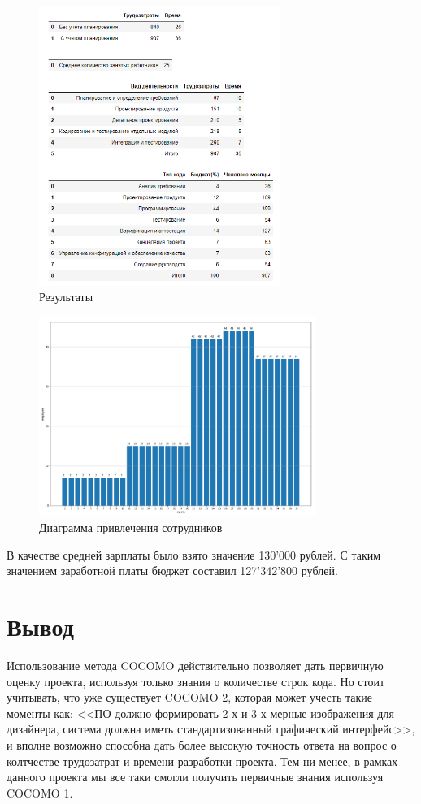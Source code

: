 \begin{figure}[H]
	\centering
	\includegraphics[width=0.7\textwidth]{img/content/task_02_result.png}
	\caption{Результаты}
	\label{fig:task_02_result}
\end{figure}

\begin{figure}[H]
	\centering
	\includegraphics[width=0.8\textwidth]{img/content/task_02_plot.png}
	\caption{Диаграмма привлечения сотрудников}
	\label{fig:task_02_plot}
\end{figure}

В качестве средней зарплаты было взято значение 130'000 рублей. С таким значением заработной платы бюджет составил 127'342'800 рублей.

\section{Вывод}

Использование метода COCOMO действительно позволяет дать первичную оценку проекта, используя только знания о количестве строк кода. Но стоит учитывать, что уже существует COCOMO 2, которая может учесть такие моменты как: <<ПО должно формировать 2-х и 3-х мерные изображения для дизайнера, система должна иметь стандартизованный графический интерфейс>>, и вполне возможно способна дать более высокую точность ответа на вопрос о колтчестве трудозатрат и времени разработки проекта. Тем ни менее, в рамках данного проекта мы все таки смогли получить первичные знания используя COCOMO 1.

